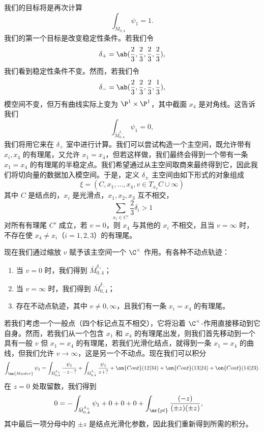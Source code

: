 \begin{exm}
    我们的目标将是再次计算
    \[ \int_{\bar{M}_{0,4}} \psi_1 = 1. \]
    我们的第一个目标是改变稳定性条件。若我们令
    \[ \delta_+ = \ab(\frac{2}{3}, \frac{2}{3}, \frac{2}{3}, \frac{2}{3}), \]
    我们看到稳定性条件不变。然而，若我们令
    \[ \delta_- = \ab(\frac{2}{3}, \frac{2}{3}, \frac{2}{3}, \frac{1}{3}), \]
    模空间不变，但万有曲线实际上变为 \(\P^1 \times \P^1\)，其中截面 \(x_4\) 是对角线。这告诉我们
    \[ \int_{\bar{M}_{0,4}^{\delta_-}} \psi_1 = 0, \]
    我们将用它来在 \(\delta_+\) 室中进行计算。我们可以尝试构造一个主空间，既允许带有 \(x_i, x_4\) 的有理尾，又允许 \(x_1 = x_4\)，但若这样做，我们最终会得到一个带有一条 \(x_1 = x_4\) 的有理尾的半稳定点。我们希望通过从主空间取商来最终得到它，因此我们将切向量的数据加入模空间。于是，定义 \(\delta_{\pm}\) 主空间由如下形式的对象组成
    \[ \xi = (C, x_1, \ldots, x_4, v \in T_{x_4} C \cup \infty) \]
    其中 \(C\) 是结点的，\(x_i\) 是光滑点，\(x_1, x_2, x_3\) 互不相交，
    \[ \sum_{x_i \in C'} \frac{2}{3} \delta_i > 1 \]
    对所有有理尾 \(C'\) 成立，若 \(v = 0\)，则 \(x_4\) 与其他的 \(x_i\) 不相交，且当 \(v = \infty\) 时，不存在使 \(x_4 \neq x_i\)（\(i = 1,2,3\)）的有理尾。

    现在我们通过缩放 \(v\) 赋予该主空间一个 \(\C^{\times}\) 作用。有各种不动点轨迹：
    \begin{enumerate}
        \item 当 \(v = 0\) 时，我们得到 \(\bar{M}_{0,4}^{\delta_+}\)；
        \item 当 \(v = \infty\) 时，我们得到 \(\bar{M}_{0,4}^{\delta_-}\)；
        \item 存在不动点轨迹，其中 \(v \neq 0,\infty\)，且我们有一条 \(x_i = x_4\) 的有理尾。
    \end{enumerate}

    若我们考虑一个一般点（四个标记点互不相交），它将沿着 \(\C^{\times}\)-作用直接移动到它自身。然而，若我们从一个包含 \(x_1\) 和 \(x_4\) 的有理尾出发，则我们首先移动到一个具有一般 \(v\) 但 \(x_1 = x_4\) 的有理尾，若我们光滑化结点，就得到一条 \(x_1 = x_4\) 的曲线，但我们允许 \(v \to \infty\)，这是另一个不动点。现在我们可以积分
    \begin{align*}
        \int_{\ms{Master}} \psi_1 = \int_{\bar{M}_{0,4}^{\delta_+}} \frac{\psi_1}{-z-?} + \int_{\bar{M}_{0,4}^{\delta_-}} \frac{\psi_1}{z+?} + \on{Cont}(12|34) + \on{Cont}(13|24) + \on{Cont}(14|23).
    \end{align*}
    在 \(z = 0\) 处取留数，我们得到
    \begin{align*}
        0 &= - \int_{\bar{M}_{0,4}^{\delta_+}} \psi_1 + 0 + 0 + 0 + \int_{\mr{pt}} \frac{(-z)}{(\pm z)(\pm z)},
    \end{align*}
    其中最后一项分母中的 \(\pm z\) 是结点光滑化参数，因此我们重新得到所需的积分。
\end{exm}

